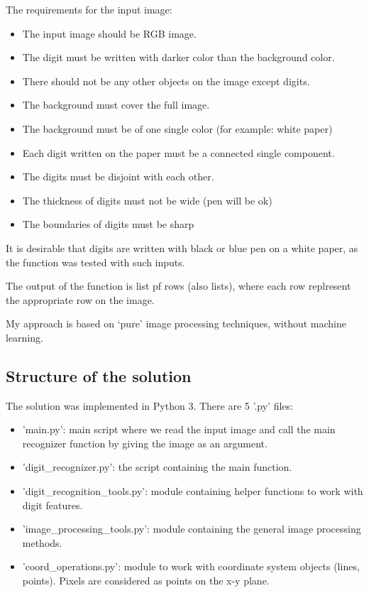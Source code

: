 \documentclass[conference]{IEEEtran}
\begin{document}
The requirements for the input image: 
\begin{itemize} 
\item The input image should be RGB image.  
\item The digit must be written with darker color than the background color.  
\item There should not be any other objects on the image except digits.  
\item The background must cover the full image. 
\item The background must be of one single color (for example: white paper) 
\item Each digit written on the paper must be a connected single component.  
\item The digits must be disjoint with each other. 
\item The thickness of digits must not be wide (pen will be ok) 
\item The boundaries of digits must be sharp 
\end{itemize} 

It is desirable that digits are written with black or blue pen on a white paper, as the function was tested with such inputs. 

The output of the function is list pf rows (also lists), where each row replresent the appropriate row on the image.

My approach is based on ‘pure’ image processing techniques, without machine learning.


\subsection{Structure of the solution}
The solution was implemented in Python 3. There are 5 '.py' files:
\begin{itemize}
    \item 'main.py': main script where we read the input image and call the main recognizer function by giving the image as an argument.
    \item 'digit\_recognizer.py': the script containing the main function.
    \item 'digit\_recognition\_tools.py': module containing helper functions to work with digit features.
    \item 'image\_processing\_tools.py': module containing the general image processing methods.
    \item 'coord\_operations.py': module to work with coordinate system objects (lines, points). Pixels are considered as points on the x-y plane.
\end{itemize} 
\end{document}
